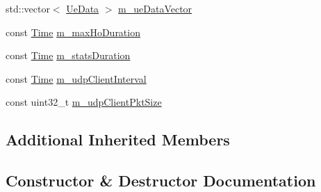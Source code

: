 \begin{DoxyCompactItemize}
\item 
std\+::vector$<$ \hyperlink{structLteX2HandoverMeasuresTestCase_1_1UeData}{Ue\+Data} $>$ \hyperlink{classLteX2HandoverMeasuresTestCase_ae4fab68537e923187590910f07df7df5}{m\+\_\+ue\+Data\+Vector}
\item 
const \hyperlink{classns3_1_1Time}{Time} \hyperlink{classLteX2HandoverMeasuresTestCase_af684b27a6bb67e77f719234008d51d6b}{m\+\_\+max\+Ho\+Duration}
\item 
const \hyperlink{classns3_1_1Time}{Time} \hyperlink{classLteX2HandoverMeasuresTestCase_a71c9a56babae7f1292626c29c8e376a2}{m\+\_\+stats\+Duration}
\item 
const \hyperlink{classns3_1_1Time}{Time} \hyperlink{classLteX2HandoverMeasuresTestCase_a64350a88e12b4f90ed812e5635febeab}{m\+\_\+udp\+Client\+Interval}
\item 
const uint32\+\_\+t \hyperlink{classLteX2HandoverMeasuresTestCase_af30c91ac30000f68beb31775b72b480e}{m\+\_\+udp\+Client\+Pkt\+Size}
\end{DoxyCompactItemize}
\subsection*{Additional Inherited Members}


\subsection{Constructor \& Destructor Documentation}
